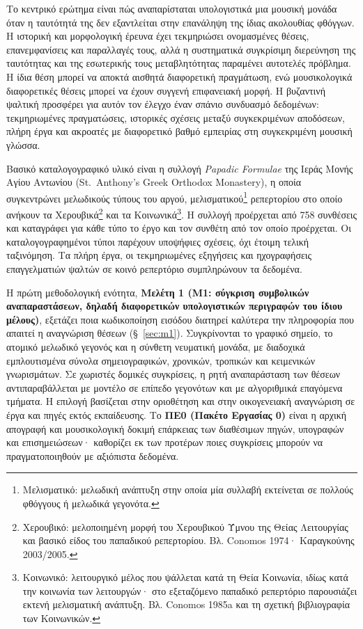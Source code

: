 \documentclass[11pt,a4paper]{article}
\begin{document}
Το κεντρικό ερώτημα είναι πώς αναπαρίσταται υπολογιστικά μια μουσική μονάδα όταν η ταυτότητά της δεν εξαντλείται στην επανάληψη της ίδιας ακολουθίας φθόγγων. Η ιστορική και μορφολογική έρευνα έχει τεκμηριώσει ονομασμένες θέσεις, επανεμφανίσεις και παραλλαγές τους, αλλά η συστηματικά συγκρίσιμη διερεύνηση της ταυτότητας και της εσωτερικής τους μεταβλητότητας παραμένει αυτοτελές πρόβλημα. Η ίδια θέση μπορεί να αποκτά αισθητά διαφορετική πραγμάτωση, ενώ μουσικολογικά διαφορετικές θέσεις μπορεί να έχουν συγγενή επιφανειακή μορφή. Η βυζαντινή ψαλτική προσφέρει για αυτόν τον έλεγχο έναν σπάνιο συνδυασμό δεδομένων: τεκμηριωμένες πραγματώσεις, ιστορικές σχέσεις μεταξύ συγκεκριμένων αποδόσεων, πλήρη έργα και ακροατές με διαφορετικό βαθμό εμπειρίας στη συγκεκριμένη μουσική γλώσσα.

Βασικό καταλογογραφικό υλικό είναι η συλλογή \emph{Papadic Formulae} της Ιεράς Μονής Αγίου Αντωνίου (St.~Anthony's Greek Orthodox Monastery), η οποία συγκεντρώνει μελωδικούς τύπους του αργού, μελισματικού\footnote{Μελισματικό: μελωδική ανάπτυξη στην οποία μία συλλαβή εκτείνεται σε πολλούς φθόγγους ή μελωδικά γεγονότα.} ρεπερτορίου στο οποίο ανήκουν τα Χερουβικά\footnote{Χερουβικό: μελοποιημένη μορφή του Χερουβικού Ύμνου της Θείας Λειτουργίας και βασικό είδος του παπαδικού ρεπερτορίου. Βλ. Conomos 1974· Καραγκούνης 2003/2005.} και τα Κοινωνικά\footnote{Κοινωνικό: λειτουργικό μέλος που ψάλλεται κατά τη Θεία Κοινωνία, ιδίως κατά την κοινωνία των λειτουργών· στο εξεταζόμενο παπαδικό ρεπερτόριο παρουσιάζει εκτενή μελισματική ανάπτυξη. Βλ. Conomos 1985a και τη σχετική βιβλιογραφία των Κοινωνικών.}. Η συλλογή προέρχεται από 758 συνθέσεις και καταγράφει για κάθε τύπο το έργο και τον συνθέτη από τον οποίο προέρχεται. Οι καταλογογραφημένοι τύποι παρέχουν υποψήφιες σχέσεις, όχι έτοιμη τελική ταξινόμηση. Τα πλήρη έργα, οι τεκμηριωμένες εξηγήσεις και ηχογραφήσεις επαγγελματιών ψαλτών σε κοινό ρεπερτόριο συμπληρώνουν τα δεδομένα.

Η πρώτη μεθοδολογική ενότητα, \textbf{Μελέτη 1 (M1: σύγκριση συμβολικών αναπαραστάσεων, δηλαδή διαφορετικών υπολογιστικών περιγραφών του ίδιου μέλους)}, εξετάζει ποια κωδικοποίηση εισόδου διατηρεί καλύτερα την πληροφορία που απαιτεί η αναγνώριση θέσεων (§~\ref{sec:m1}). Συγκρίνονται το γραφικό σημείο, το ατομικό μελωδικό γεγονός και η σύνθετη νευματική μονάδα, με διαδοχικά εμπλουτισμένα σύνολα σημειογραφικών, χρονικών, τροπικών και κειμενικών γνωρισμάτων. Σε χωριστές δομικές συγκρίσεις, η ρητή αναπαράσταση των θέσεων αντιπαραβάλλεται με μοντέλο σε επίπεδο γεγονότων και με αλγοριθμικά επαγόμενα τμήματα. Η επιλογή βασίζεται στην οριοθέτηση και στην οικογενειακή αναγνώριση σε έργα και πηγές εκτός εκπαίδευσης. Το \textbf{ΠΕ0 (Πακέτο Εργασίας 0)} είναι η αρχική απογραφή και μουσικολογική δοκιμή επάρκειας των διαθέσιμων πηγών, υπογραφών και επισημειώσεων· καθορίζει εκ των προτέρων ποιες συγκρίσεις μπορούν να πραγματοποιηθούν με αξιόπιστα δεδομένα.
\end{document}
